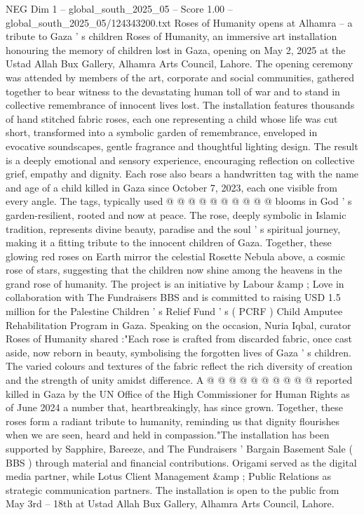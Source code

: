 \begin{textsample}{NEG Dim 1 – global\_south\_2025\_05 – Score 1.00 – global\_south\_2025\_05/124343200.txt}  \label{ex:f1_neg_168}
Roses of Humanity opens at Alhamra -- a tribute to Gaza ' s children Roses of Humanity, an immersive art installation honouring the memory of children lost in Gaza, opening on May 2, 2025 at the Ustad Allah Bux Gallery, Alhamra Arts Council, Lahore.
The opening ceremony was attended by members of the art, corporate and social communities, gathered together to bear witness to the devastating human toll of war and to stand in collective remembrance of innocent lives lost.
The installation features thousands of hand stitched fabric roses, each one representing a child whose life was cut short, transformed into a symbolic garden of remembrance, enveloped in evocative soundscapes, gentle fragrance and thoughtful lighting design.
The result is a deeply emotional and sensory experience, encouraging reflection on collective grief, empathy and dignity.
Each rose also bears a handwritten tag with the name and age of a child killed in Gaza since October 7, 2023, each one visible from every angle.
The tags, typically used @ @ @ @ @ @ @ @ @ @ blooms in God ' s garden-resilient, rooted and now at peace.
The rose, deeply symbolic in Islamic tradition, represents divine beauty, paradise and the soul ' s spiritual journey, making it a fitting tribute to the innocent children of Gaza.
Together, these glowing red roses on Earth mirror the celestial Rosette Nebula above, a cosmic rose of stars, suggesting that the children now shine among the heavens in the grand rose of humanity.
The project is an initiative by Labour \&amp ; Love in collaboration with The Fundraisers BBS and is committed to raising USD 1.5 million for the Palestine Children ' s Relief Fund ' s ( PCRF ) Child Amputee Rehabilitation Program in Gaza.
Speaking on the occasion, Nuria Iqbal, curator Roses of Humanity shared :"Each rose is crafted from discarded fabric, once cast aside, now reborn in beauty, symbolising the forgotten lives of Gaza ' s children.
The varied colours and textures of the fabric reflect the rich diversity of creation and the strength of unity amidst difference.
A @ @ @ @ @ @ @ @ @ @ reported killed in Gaza by the UN Office of the High Commissioner for Human Rights as of June 2024 a number that, heartbreakingly, has since grown.
Together, these roses form a radiant tribute to humanity, reminding us that dignity flourishes when we are seen, heard and held in compassion."The installation has been supported by Sapphire, Bareeze, and The Fundraisers ' Bargain Basement Sale ( BBS ) through material and financial contributions.
Origami served as the digital media partner, while Lotus Client Management \&amp ; Public Relations as strategic communication partners.
The installation is open to the public from May 3rd -- 18th at Ustad Allah Bux Gallery, Alhamra Arts Council, Lahore.

\end{textsample}

